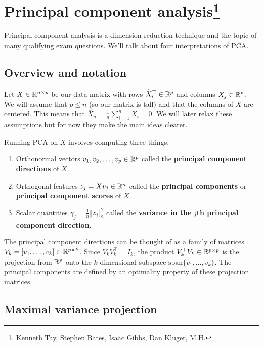 \section{Principal component analysis\footnote{Kenneth Tay, Stephen Bates, Isaac Gibbs, Dan Kluger, M.H.}}

Principal component analysis is a dimension reduction technique and the topic of many qualifying exam questions. We'll talk about four interpretations of PCA.

\subsection{Overview and notation}


Let $X \in \mathbb{R}^{n \times p}$ be our data matrix with rows $\widetilde{X}_i^\top  \in \mathbb{R}^p$ and columns $X_j \in \mathbb{R}^n$. We will assume that $p \le n$ (so our matrix is tall) and that the columns of $X$ are centered. This means that $\bar{X}_n = \frac{1}{n}\sum_{i=1}^n\widetilde{X}_i = 0$. We will later relax these assumptions but for now they make the main ideas clearer.

Running PCA on $X$ involves computing three things:
\begin{enumerate}
    \item Orthonormal vectors $v_1,v_2,\ldots,v_p \in \mathbb{R}^p$ called the \textbf{principal component directions} of $X$.
    \item Orthogonal features $z_j = Xv_j \in \mathbb{R}^n$ called the \textbf{principal components} or \textbf{principal component scores} of $X$.
    \item Scalar quantities $\gamma_j = \frac{1}{n}\Vert z_j \Vert^2_2$ called the \textbf{variance in the} $j$\textbf{th principal component direction}. 
\end{enumerate}
The principal component directions can be thought of as a family of matrices $V_k = [v_1,\ldots,v_k] \in \mathbb{R}^{p \times k}$. Since $V_k V_k^\top = I_k$, the product $V_k^\top V_k  \in \mathbb{R}^{p \times p}$ is the projection from $\mathbb{R}^p$ onto the $k$-dimensional subspace $\text{span}\{v_1,\ldots,v_k\}$. The principal components are defined by an optimality property of these projection matrices. 

\subsection{Maximal variance projection}

